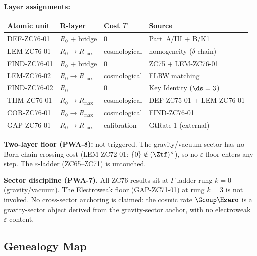 \documentclass[12pt, a4paper]{article}
\begin{document}
\begin{layerbox}[title={R-Layer Assignments for ZC76}]

\textbf{Layer assignments:}

{\small\renewcommand{\arraystretch}{1.25}
\begin{center}
\begin{tabular}{@{}llll@{}}
\toprule
Atomic unit & R-layer & Cost $T$ & Source \\
\midrule
DEF-ZC76-01  & $R_0$ + bridge & $0$ & Part~A/III + B/K1 \\
LEM-ZC76-01  & $R_0{\to}R_{\max}$ & cosmological & homogeneity ($\delta$-chain) \\
FIND-ZC76-01 & $R_0$ + bridge & $0$ & ZC75 + LEM-ZC76-01 \\
LEM-ZC76-02  & $R_0{\to}R_{\max}$ & cosmological & FLRW matching \\
FIND-ZC76-02 & $R_0$ & $0$ & Key Identity ($\ds=3$) \\
THM-ZC76-01  & $R_0{\to}R_{\max}$ & cosmological & DEF-ZC75-01 + LEM-ZC76-01 \\
COR-ZC76-01  & $R_0{\to}R_{\max}$ & cosmological & FIND-ZC76-01 \\
GAP-ZC76-01  & $R_0{\to}R_{\max}$ & calibration & GtRate-1 (external) \\
\bottomrule
\end{tabular}
\end{center}}

\textbf{Two-layer floor (PWA-8):} not triggered. The gravity/vacuum
sector has no Born-chain crossing cost (LEM-ZC72-01: $\{0\}\notin
(\Ztf)^\times$), so no $\varepsilon$-floor enters any step. The
$\varepsilon$-ladder (ZC65--ZC71) is untouched.

\textbf{Sector discipline (PWA-7).} All ZC76 results sit at $\Gamma$-ladder
rung $k=0$ (gravity/vacuum). The Electroweak floor (GAP-ZC71-01) at rung
$k=3$ is not invoked. No cross-sector anchoring is claimed: the cosmic
rate $\Gcoup\Hzero$ is a gravity-sector object derived from the
gravity-sector anchor, with no electroweak $\varepsilon$ content.
\end{layerbox}

\subsection{Genealogy Map}
\label{sec:genealogy}
\end{document}
